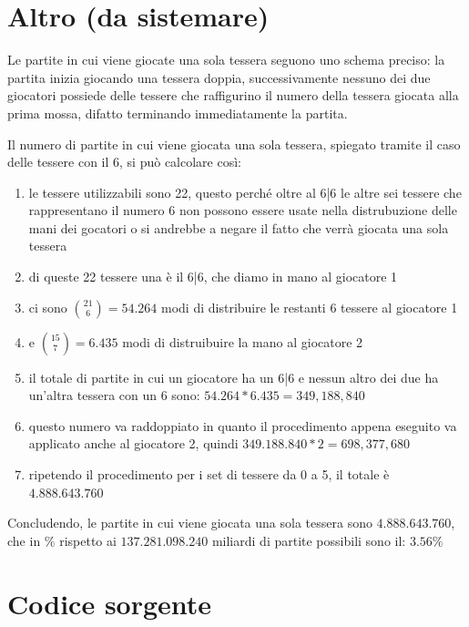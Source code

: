 \documentclass[a4paper,12pt]{report} %
\begin{document}
\chapter{Altro (da sistemare)}

Le partite in cui viene giocate una sola tessera seguono uno schema preciso: la partita inizia giocando una tessera doppia, successivamente nessuno dei due giocatori possiede delle tessere che raffigurino il numero della tessera giocata alla prima mossa, difatto terminando immediatamente la partita.

Il numero di partite in cui viene giocata una sola tessera, spiegato tramite il caso delle tessere con il 6, si può calcolare così:

\begin{enumerate}
    \item le tessere utilizzabili sono 22, questo perché oltre al 6|6 le altre sei tessere che rappresentano il numero 6 non possono essere usate nella distrubuzione delle mani dei gocatori o si andrebbe a negare il fatto che verrà giocata una sola tessera 
    \item di queste 22 tessere una è il 6|6, che diamo in mano al giocatore 1
    \item ci sono \(\binom{21}{6} = 54.264\) modi di distribuire le restanti 6 tessere al giocatore 1
    \item e \(\binom{15}{7} = 6.435\) modi di distruibuire la mano al giocatore 2
    \item il totale di partite in cui un giocatore ha un 6|6 e nessun altro dei due ha un'altra tessera con un 6 sono: \(54.264*6.435 = 349,188,840\)
    \item questo numero va raddoppiato in quanto il procedimento appena eseguito va applicato anche al giocatore 2, quindi \(349.188.840 * 2 = 698,377,680\)
    \item ripetendo il procedimento per i set di tessere da 0 a 5, il totale è \(4.888.643.760\)
\end{enumerate}

Concludendo, le partite in cui viene giocata una sola tessera sono \(4.888.643.760\), che in \% rispetto ai \(137.281.098.240\) miliardi di partite possibili sono il: \(3.56\%\)





\appendix
\chapter{Codice sorgente}

\end{document}
